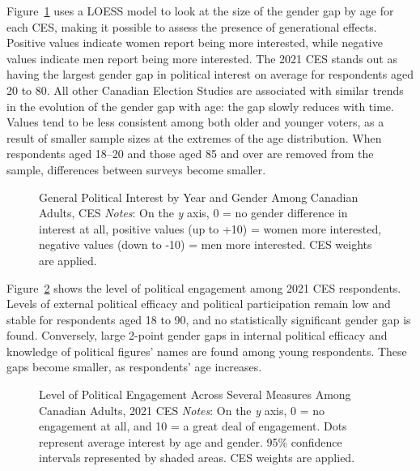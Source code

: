 \documentclass[
  letterpaper,
  DIV=11,
  numbers=noendperiod]{scrreprt}
\begin{document}
Figure~\ref{fig-cesgapyearage} uses a LOESS model to look at the size of
the gender gap by age for each CES, making it possible to assess the
presence of generational effects. Positive values indicate women report
being more interested, while negative values indicate men report being
more interested. The 2021 CES stands out as having the largest gender
gap in political interest on average for respondents aged 20 to 80. All
other Canadian Election Studies are associated with similar trends in
the evolution of the gender gap with age: the gap slowly reduces with
time. Values tend to be less consistent among both older and younger
voters, as a result of smaller sample sizes at the extremes of the age
distribution. When respondents aged 18--20 and those aged 85 and over
are removed from the sample, differences between surveys become smaller.

\begin{figure}


\caption{\label{fig-cesgapyearage}General Political Interest by Year and
Gender Among Canadian Adults, CES \newline \textit{Notes}: On the
\textit{y} axis, 0 = no gender difference in interest at all, positive
values (up to +10) = women more interested, negative values (down to
-10) = men more interested. CES weights are applied.}

\end{figure}%

Figure~\ref{fig-timepoliticalengagement} shows the level of political
engagement among 2021 CES respondents. Levels of external political
efficacy and political participation remain low and stable for
respondents aged 18 to 90, and no statistically significant gender gap
is found. Conversely, large 2-point gender gaps in internal political
efficacy and knowledge of political figures' names are found among young
respondents. These gaps become smaller, as respondents' age increases.

\begin{figure}


\caption{\label{fig-timepoliticalengagement}Level of Political
Engagement Across Several Measures Among Canadian Adults, 2021 CES
\newline \textit{Notes}: On the \textit{y} axis, 0 = no engagement at
all, and 10 = a great deal of engagement. Dots represent average
interest by age and gender. 95\% confidence intervals represented by
shaded areas. CES weights are applied.}

\end{figure}%
\end{document}
